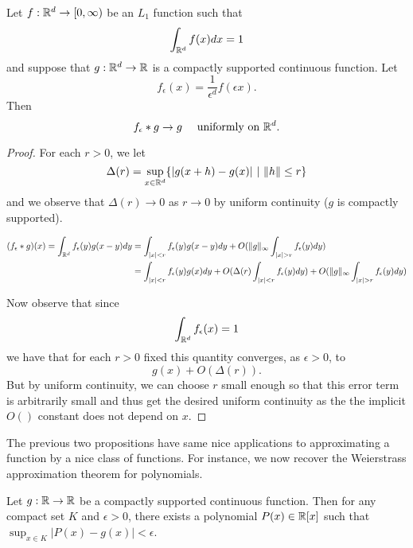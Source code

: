 \documentclass[twoside, a4paper, 10pt]{amsart}
\begin{document}
\begin{prop}\label{prop: approx identity} Let $f:\mathbb{R}^d \to [0,\infty)$ be an $L_1$ function such that $$\int_{\mathbb{R}^d} f(x) dx = 1$$ and suppose that $g:\mathbb{R}^d \to \mathbb{R}$ is a compactly supported continuous function. Let $$f_{\epsilon}(x) = \frac{1}{\epsilon^d}f(\epsilon x).$$ Then $$f_{\epsilon} * g \to g \quad \text{ uniformly on } \mathbb{R}^d.$$

\end{prop}

\begin{proof} For each $r>0$, we let $$\Delta(r) = \sup_{x \in \mathbb{R}^d} \{ |g(x+h) - g(x)| ~|~ \|h\| \leq r \}$$ and we observe that $\Delta(r) \to 0$ as $r \to 0$ by uniform continuity ($g$ is compactly supported).

\begin{align*} (f_{\epsilon} *g)(x) = \int_{\bR^d} f_{\epsilon} (y) g(x-y) dy &= \int_{|x| < r} f_{\epsilon}(y) g(x-y) dy + O(\| g \|_{\infty} \int_{|x|>r} f_{\epsilon}(y) dy) \\ &= \int_{|x| < r} f_{\epsilon}(y) g(x) dy + O(\Delta(r) \int_{|x| < r} f_{\epsilon}(y) dy )  + O(\| g \|_{\infty} \int_{|x|>r} f_{\epsilon}(y) dy) \end{align*} 

Now observe that since $$\int_{\mathbb{R}^d} f_{\epsilon}(x) = 1$$ we have that for each $r>0$ fixed this quantity converges, as $\epsilon>0$, to $$g(x) + O(\Delta(r)).$$ But by uniform continuity, we can choose $r$ small enough so that this error term is arbitrarily small and thus get the desired uniform continuity as the the implicit $O()$ constant does not depend on $x$. \end{proof}

The previous two propositions have same nice applications to approximating a function by a nice class of functions. For instance, we now recover the Weierstrass approximation theorem for polynomials.

\begin{thm} Let $g:\mathbb{R} \to \mathbb{R}$ be a compactly supported continuous function. Then for any compact set $K$ and $\epsilon >0$, there exists a polynomial $P(x) \in \mathbb{R}[x]$ such that $\sup_{x \in K} |P(x) - g(x)| < \epsilon$.

\end{thm}
\end{document}
